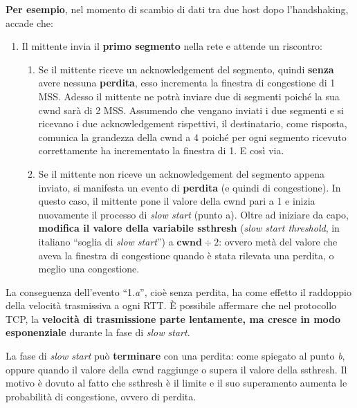 \documentclass[a4paper]{article}
\newcommand{\dquotes}[1]{``#1''}
\begin{document}
	\noindent
	\textbf{Per esempio}, nel momento di scambio di dati tra due host dopo l'handshaking, accade che:
	\begin{enumerate}
		\item Il mittente invia il \textbf{primo segmento} nella rete e attende un riscontro:
		\begin{enumerate}[label=\alph*.]
			\item Se il mittente riceve un acknowledgement del segmento, quindi \textbf{senza} avere nessuna \textbf{perdita}, esso incrementa la finestra di congestione di 1 MSS.\newline
			Adesso il mittente ne potrà inviare due di segmenti poiché la sua \textsf{cwnd} sarà di 2 MSS.\newline
			Assumendo che vengano inviati i due segmenti e si ricevano i due acknowledgement rispettivi, il destinatario, come risposta, comunica la grandezza della \textsf{cwnd} a 4 poiché per ogni segmento ricevuto correttamente ha incrementato la finestra di 1.\newline
			E così via.
			
			\item Se il mittente non riceve un acknowledgement del segmento appena inviato, si manifesta un evento di \textbf{perdita} (e quindi di congestione).\newline
			In questo caso, il mittente pone il valore della \textsf{cwnd} pari a 1 e inizia nuovamente il processo di \emph{slow start} (punto a).\newline
			Oltre ad iniziare da capo, \textbf{modifica il valore della variabile \textsf{ssthresh}} (\emph{slow start threshold}, in italiano \dquotes{soglia di \emph{slow start}}) a $\textbf{cwnd} \div 2$: ovvero metà del valore che aveva la finestra di congestione quando è stata rilevata una perdita, o meglio una congestione.
		\end{enumerate}
	\end{enumerate}
	La conseguenza dell’evento \dquotes{1.\emph{a}}, cioè senza perdita, ha come effetto il raddoppio della velocità trasmissiva a ogni RTT. È possibile affermare che nel protocollo TCP, la \textbf{velocità di trasmissione parte lentamente, ma cresce in modo esponenziale} durante la fase di \emph{slow start}.\newline
	
	\noindent
	La fase di \emph{slow start} può \textbf{terminare} con una perdita: come spiegato al punto \emph{b}, oppure quando il valore della \textsf{cwnd} raggiunge o supera il valore della \textsf{ssthresh}. Il motivo è dovuto al fatto che \textsf{ssthresh} è il limite e il suo superamento aumenta le probabilità di congestione, ovvero di perdita.\newline
	
\end{document}
